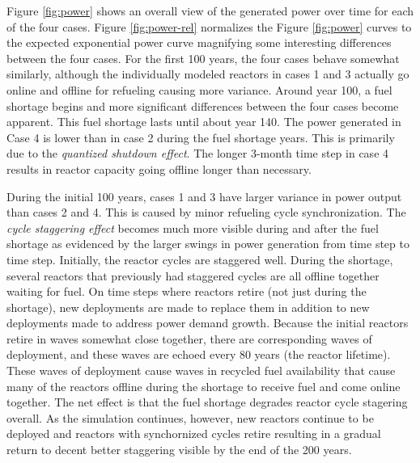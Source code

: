 \documentclass{style}
\begin{document}
Figure \ref{fig:power} shows an overall view of the generated
power over time for each of the four cases.  Figure
\ref{fig:power-rel} normalizes the Figure
\ref{fig:power} curves to the expected exponential power curve
magnifying some interesting differences between the four cases.  For the first
100 years, the four cases behave somewhat similarly, although the individually
modeled reactors in cases 1 and 3 actually go online and offline for refueling
causing more variance.  Around year 100, a fuel shortage begins and more
significant differences between the four cases become apparent. This fuel
shortage lasts until about year 140. The power generated in Case 4 is lower
than in case 2 during the fuel shortage years. This is primarily due to the
\emph{quantized shutdown effect}.  The longer 3-month time step in case 4
results in reactor capacity going offline longer than necessary.

During the initial 100 years, cases 1 and 3 have larger variance in power
output than cases 2 and 4.  This is caused by minor refueling cycle
synchronization.  The \emph{cycle staggering effect} becomes much more visible
during and after the fuel shortage as evidenced by the larger swings in power
generation from time step to time step.  Initially, the reactor cycles are
staggered well.  During the shortage, several reactors that previously had
staggered cycles are all offline together waiting for fuel.  On time steps
where reactors retire (not just during the shortage), new deployments are made
to replace them in addition to new deployments made to address power demand
growth.  Because the initial reactors retire in waves somewhat close together,
there are corresponding waves of deployment, and these waves are echoed every
80 years (the reactor lifetime).  These waves of deployment cause waves in
recycled fuel availability that cause many of the reactors offline during the
shortage to receive fuel and come online together.  The net effect is that the
fuel shortage degrades reactor cycle stagering overall.  As the simulation
continues, however, new reactors continue to be deployed and reactors with
synchornized cycles retire resulting in a gradual return to decent better
staggering visible by the end of the 200 years.
\end{document}
